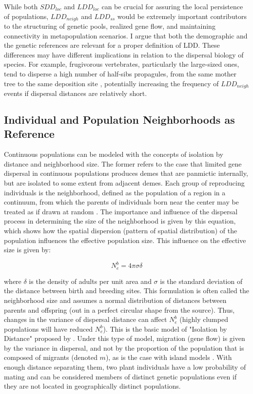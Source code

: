 \documentclass[a4paper, 12pt]{article}
\begin{document}
\begin{linenumbers}
While both $SDD_{loc}$ and $LDD_{loc}$ can be crucial for assuring the local persistence of populations, $LDD_{neigh}$ and $LDD_{ss}$ would be extremely important contributors to the structuring of genetic pools, realized gene flow, and maintaining connectivity in metapopulation scenarios. I argue that both the demographic and the genetic references are relevant for a proper definition of LDD. These differences may have different implications in relation to the dispersal biology of species. For example, frugivorous vertebrates, particularly the large-sized ones, tend to disperse a high number of half-sibs propagules, from the same mother tree to the same deposition site \citep{Jordano:2000ft}, potentially increasing the frequency of $LDD_{neigh}$ events if dispersal distances are relatively short.   


\subsection*{Individual and Population Neighborhoods as Reference}

Continuous populations can be modeled with the concepts of isolation by distance and neighborhood size\citep{Wright:1943aa,Wright:1946aa}. The former refers to the case that limited gene dispersal in continuous populations produces demes that are panmictic internally, but are isolated to some extent from adjacent demes. Each group of reproducing individuals is the neighborhood, defined as the population of a region in a continuum, from which the parents of individuals born near the center may be treated as if drawn at random \citep{Wright:1969mb}. The importance and influence of the dispersal process in determining the size of the neighborhood is given by this equation, which shows how the spatial dispersion (pattern of spatial distribution) of the population influences the effective population size. This influence on the effective size is given by:  

\begin{equation}
					N^b_e= 4 \pi \sigma \delta
\end{equation}

where $\delta$ is the density of adults per unit area and $\sigma$ is the standard deviation of the distance between birth and breeding sites. This formulation is often called the neighborhood size and assumes a normal distribution of distances between parents and offspring (out in a perfect circular shape from the source). Thus, changes in the variance of dispersal distance can affect $N^b_e$ (highly clumped populations will have reduced $N^b_e$). This is the basic model of "Isolation by Distance" proposed by   \citet{Wright:1943aa,Wright:1946aa}. Under this type of model, migration (gene flow) is given by the variance in dispersal, and not by the proportion of the population that is composed of migrants (denoted $m$), as is the case with island models \citep{Slatkin:1985qb}. With enough distance separating them, two plant individuals have a low probability of mating and can be considered members of distinct genetic populations even if they are not located in geographically distinct populations.


\end{linenumbers}
\end{document}
